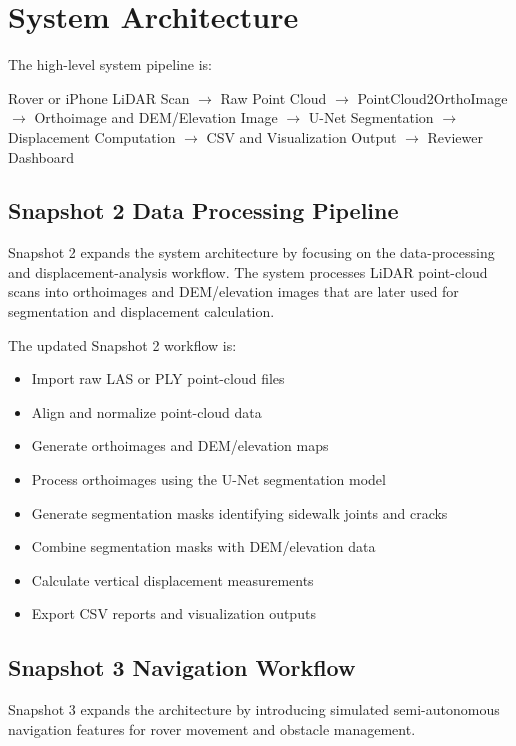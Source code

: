 \documentclass{article}
\begin{document}
\section{System Architecture}

The high-level system pipeline is:

Rover or iPhone LiDAR Scan $\rightarrow$ Raw Point Cloud $\rightarrow$ PointCloud2OrthoImage $\rightarrow$ Orthoimage and DEM/Elevation Image $\rightarrow$ U-Net Segmentation $\rightarrow$ Displacement Computation $\rightarrow$ CSV and Visualization Output $\rightarrow$ Reviewer Dashboard

\subsection{Snapshot 2 Data Processing Pipeline}

Snapshot 2 expands the system architecture by focusing on the data-processing and displacement-analysis workflow. The system processes LiDAR point-cloud scans into orthoimages and DEM/elevation images that are later used for segmentation and displacement calculation.

The updated Snapshot 2 workflow is:

\begin{itemize}
    \item Import raw LAS or PLY point-cloud files
    \item Align and normalize point-cloud data
    \item Generate orthoimages and DEM/elevation maps
    \item Process orthoimages using the U-Net segmentation model
    \item Generate segmentation masks identifying sidewalk joints and cracks
    \item Combine segmentation masks with DEM/elevation data
    \item Calculate vertical displacement measurements
    \item Export CSV reports and visualization outputs
\end{itemize}

\subsection{Snapshot 3 Navigation Workflow}

Snapshot 3 expands the architecture by introducing simulated semi-autonomous navigation features for rover movement and obstacle management.
\end{document}
